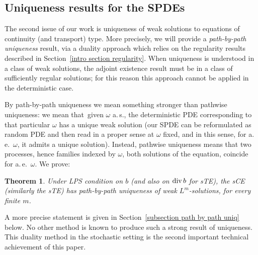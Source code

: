 \documentclass[a4paper,10pt]{article}
\newtheorem{theorem}{Theorem}
\def\func#1{\mathop{\rm #1}}
\begin{document}
\subsection{Uniqueness results for the SPDEs\label{intro section uniqueness}}

The second issue of our work is uniqueness of weak solutions to equations of
continuity (and transport) type. More precisely, we will provide a 
\textit{path-by-path uniqueness} result, via a duality approach which relies on the
regularity results described in Section~\ref{intro section regularity}. When
uniqueness is understood in a class of weak solutions, the adjoint existence
result must be in a class of sufficiently regular solutions; for this reason this
approach cannot be applied in the deterministic case.

By path-by-path uniqueness we mean something stronger than pathwise
uniqueness: we mean that\ given $\omega $ a.\,s., the deterministic PDE
corresponding to that particular $\omega $ has a unique weak solution (our
SPDE can be reformulated as random PDE and then read in a proper sense at 
$\omega $ fixed, and in this sense, for a.\,e.\ $\omega $, it admits a unique
solution). Instead, pathwise uniqueness means that two processes, hence
families indexed by $\omega $, both solutions of the equation, coincide for
a.\,e.\ $\omega $. We prove:

\begin{theorem}
Under LPS condition on $b$ (and also on $\func{div}b$ for sTE), the sCE (similarly the sTE) has path-by-path uniqueness of weak $L^{m}$-solutions, for every finite $m$.
\end{theorem}

A more precise statement is given in Section~\ref{subsection path by path
uniq} below. No other method is known to produce such a strong result of
uniqueness. This duality method in the stochastic setting is the second
important technical achievement of this paper.
\end{document}
